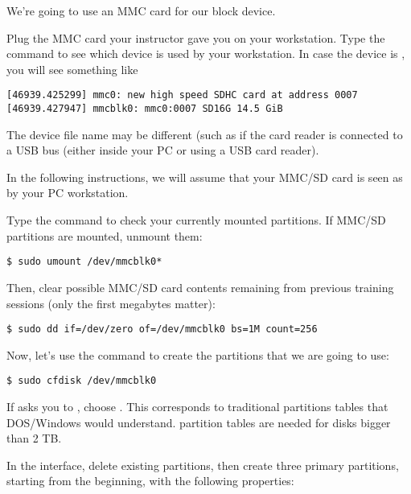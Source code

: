 We're going to use an MMC card for our block device.

Plug the MMC card your instructor gave you on your workstation. Type
the  command to see which device is used by your
workstation. In case the device is , you will see
something like

\begin{verbatim}
[46939.425299] mmc0: new high speed SDHC card at address 0007
[46939.427947] mmcblk0: mmc0:0007 SD16G 14.5 GiB
\end{verbatim}

The device file name may be different (such as 
if the card reader is connected to a USB bus (either inside your PC
or using a USB card reader).

In the following instructions, we will assume that your MMC/SD card
is seen as  by your PC workstation.

Type the  command to check your currently mounted
partitions. If MMC/SD partitions are mounted, unmount them:

\begin{verbatim}
$ sudo umount /dev/mmcblk0*
\end{verbatim}

Then, clear possible MMC/SD card contents remaining from previous
training sessions (only the first megabytes matter):

\begin{verbatim}
$ sudo dd if=/dev/zero of=/dev/mmcblk0 bs=1M count=256
\end{verbatim}

Now, let's use the  command to create the partitions that
we are going to use:

\begin{verbatim}
$ sudo cfdisk /dev/mmcblk0
\end{verbatim}

If  asks you to , choose 
. This corresponds to traditional partitions tables that DOS/Windows
would understand.  partition tables are needed for disks bigger
than 2 TB. 

In the  interface, delete existing partitions, then
create three primary partitions, starting from the beginning, with the
following properties:

